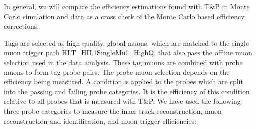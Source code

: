 %
%
In general, %
we will compare the efficiency estimations found with T\&P in Monte Carlo simulation and  data as a cross check of the Monte Carlo based efficiency corrections. 

Tags are selected as high quality, global muons, which are matched to the single muon trigger path HLT\_HIL1SingleMu0\_HighQ,  
that also pass the offline muon selection used in the data analysis.
%
These tag muons are combined with probe muons to form tag-probe
pairs. The probe muon selection depends on the efficiency being measured.
A condition is applied to the probes which are split into the passing and failing probe categories. 
It is the efficiency of this condition relative to all probes that is measured with T\&P.
%
We have used the following three probe categories to measure the inner-track reconstruction,
muon reconstruction and identification, and muon trigger efficiencies:
%
